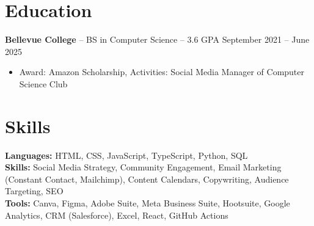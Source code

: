 \documentclass[11pt]{article}       %
\begin{document}

\vspace{-18.5pt}

\section*{Education}
\textbf{Bellevue College} -- BS in Computer Science -- 3.6 GPA \hfill September 2021 -- June 2025\\
\vspace{-9pt}
\begin{itemize}
  \item Award: Amazon Scholarship, Activities: Social Media Manager of Computer Science Club
\end{itemize}

\vspace{-18.5pt}

\section*{Skills}
\textbf{Languages:} HTML, CSS, JavaScript, TypeScript, Python, SQL\\
\textbf{Skills:} Social Media Strategy, Community Engagement, Email Marketing (Constant Contact, Mailchimp), Content Calendars, Copywriting, Audience Targeting, SEO\\
\textbf{Tools:} Canva, Figma, Adobe Suite, Meta Business Suite, Hootsuite, Google Analytics, CRM (Salesforce), Excel, React, GitHub Actions\\

\vspace{-6.5pt}
\end{document}
